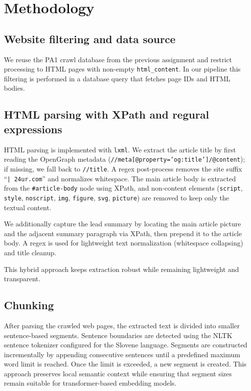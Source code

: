 \documentclass[conference]{IEEEtran}
\begin{document}
\section{Methodology}


\subsection{Website filtering and data source}
We reuse the PA1 crawl database from the previous assignment and restrict processing to HTML pages with non-empty \texttt{html\_content}. In our pipeline this filtering is performed in a database query that fetches page IDs and HTML bodies.



\subsection{HTML parsing with XPath and regural expressions}
HTML parsing is implemented with \texttt{lxml}. We extract the article title by first reading the OpenGraph metadata (\texttt{//meta[@property='og:title']/@content}); if missing, we fall back to \texttt{//title}. A regex post-process removes the site suffix ``\texttt{| 24ur.com}'' and normalizes whitespace. The main article body is extracted from the \texttt{\#article-body} node using XPath, and non-content elements (\texttt{script}, \texttt{style}, \texttt{noscript}, \texttt{img}, \texttt{figure}, \texttt{svg}, \texttt{picture}) are removed to keep only the textual content.

We additionally capture the lead summary by locating the main article picture and the adjacent summary paragraph via XPath, then prepend it to the article body. A regex is used for lightweight text normalization (whitespace collapsing) and title cleanup.

This hybrid approach keeps extraction robust while remaining lightweight and transparent.








\subsection{Chunking}

After parsing the crawled web pages, the extracted text is divided into smaller sentence-based segments. Sentence boundaries are detected using the NLTK sentence tokenizer configured for the Slovene language. Segments are constructed incrementally by appending consecutive sentences until a predefined maximum word limit is reached. Once the limit is exceeded, a new segment is created. This approach preserves local semantic context while ensuring that segment sizes remain suitable for transformer-based embedding models.
\end{document}
